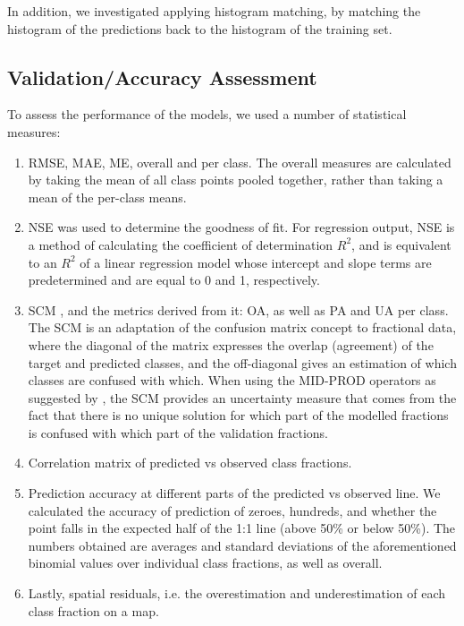 \documentclass[a4paper,10pt]{article}
\begin{document}
In addition, we investigated applying histogram matching, by matching the histogram of the predictions back to the histogram of the training set.

\subsection{Validation/Accuracy Assessment}

To assess the performance of the models, we used a number of statistical measures:

\begin{enumerate}
 \item \Gls{RMSE}, \ac{MAE}, \ac{ME}, overall and per class.
The overall measures are calculated by taking the mean of all class points pooled together, rather than taking a mean of the per-class means.
 \item \Gls{NSE} was used to determine the goodness of fit.
For regression output, \ac{NSE} is a method of calculating the coefficient of determination $R^2$, and is equivalent to an $R^2$ of a linear regression model whose intercept and slope terms are predetermined and are equal to 0 and 1, respectively.
 \item \Gls{SCM} \citep{silvan-cardenas_sub-pixel_2008}, and the metrics derived from it: \ac{OA}, as well as \ac{PA} and \ac{UA} per class.
The \gls{SCM} is an adaptation of the confusion matrix concept to fractional data, where the diagonal of the matrix expresses the overlap (agreement) of the target and predicted classes, and the off-diagonal gives an estimation of which classes are confused with which.
When using the MID-PROD operators as suggested by \citet{silvan-cardenas_sub-pixel_2008}, the \ac{SCM} provides an uncertainty measure that comes from the fact that there is no unique solution for which part of the modelled fractions is confused with which part of the validation fractions.
 \item Correlation matrix of predicted vs observed class fractions.
 \item Prediction accuracy at different parts of the predicted vs observed line.
We calculated the accuracy of prediction of zeroes, hundreds, and whether the point falls in the expected half of the 1:1 line (above 50\% or below 50\%).
The numbers obtained are averages and standard deviations of the aforementioned binomial values over individual class fractions, as well as overall.
\item Lastly, spatial residuals, i.e. the overestimation and underestimation of each class fraction on a map.
\end{enumerate}
\end{document}
